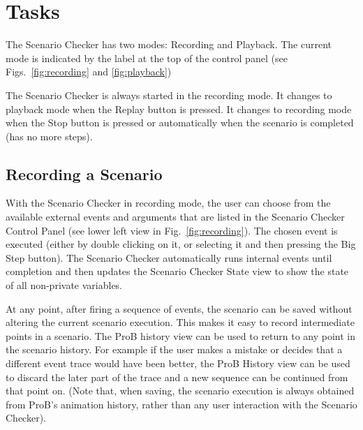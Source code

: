\section{Tasks}
\label{sec:tasks}

The Scenario Checker has two modes: Recording and Playback. 
The current mode is indicated by the label at the top of the control panel (see Figs.~\ref{fig:recording} and \ref{fig:playback}) 

The Scenario Checker is always started in the recording mode.
It changes to playback mode when the Replay button is pressed.
It changes to recording mode when the Stop button is pressed or automatically when the scenario is completed (has no more steps).

\subsection{Recording a Scenario}
\label{sec:recording}

With the Scenario Checker in recording mode, the user can choose from the available external events and arguments that are listed in the Scenario Checker Control Panel (see lower left view in Fig.~\ref{fig:recording}). 
The chosen  event is executed (either by double clicking on it, or selecting it and then pressing the Big Step button).
The Scenario Checker automatically runs internal events until completion and then updates the Scenario Checker State view to show the state of all non-private variables.

At any point, after firing a sequence of events, the scenario can be saved without altering the current scenario execution. 
This makes it easy to record intermediate points in a scenario.
The ProB history view can be used to return to any point in the scenario history.
For example if the user makes a mistake or decides that a different event trace would have been better, the ProB History view can be used to discard the later part of the trace and a new sequence can be continued from that point on.
(Note that, when saving, the scenario execution is always obtained from ProB's animation history, rather than any user interaction with the Scenario Checker).

